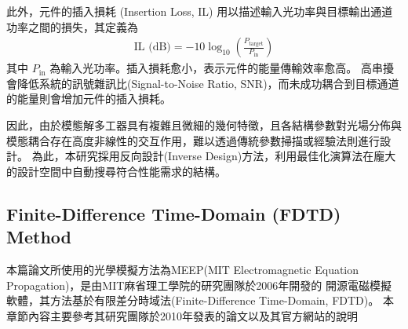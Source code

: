 此外，元件的插入損耗 (Insertion Loss, IL) 用以描述輸入光功率與目標輸出通道功率之間的損失，其定義為
\begin{align}
\text{IL (dB)} = -10 \log_{10} \left( \frac{P_{\text{target}}}{P_{\text{in}}} \right)
\label{eq:insertion loss}
\end{align}
其中 $P_{\mathrm{in}}$ 為輸入光功率。插入損耗愈小，表示元件的能量傳輸效率愈高。
高串擾會降低系統的訊號雜訊比(Signal-to-Noise Ratio, SNR)，而未成功耦合到目標通道的能量則會增加元件的插入損耗。

因此，由於模態解多工器具有複雜且微細的幾何特徵，且各結構參數對光場分佈與模態耦合存在高度非線性的交互作用，難以透過傳統參數掃描或經驗法則進行設計。
為此，本研究採用反向設計(Inverse Design)方法，利用最佳化演算法在龐大的設計空間中自動搜尋符合性能需求的結構。

\subsection{Finite-Difference Time-Domain (FDTD) Method}

本篇論文所使用的光學模擬方法為MEEP(MIT Electromagnetic Equation Propagation)，是由MIT麻省理工學院的研究團隊於2006年開發的
開源電磁模擬軟體，其方法基於有限差分時域法(Finite-Difference Time-Domain, FDTD)。
本章節內容主要參考其研究團隊於2010年發表的論文\cite{oskooi2010_meep}以及其官方網站的說明\cite{meep_docs}

